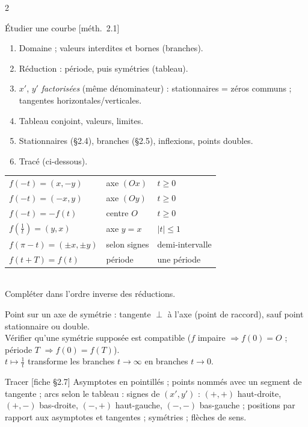 \documentclass[a4paper,10pt]{article}
\newcommand{\livre}[1]{{\sffamily\scriptsize\color{Gris}[#1]}}
\begin{document}
\begin{multicols}{2}
\begin{METH}{Étudier une courbe \livre{méth.~2.1}}
\begin{enumerate}
\item Domaine ; valeurs interdites et bornes (branches).
\item Réduction : période, puis symétries (tableau).
\item $x'$, $y'$ \emph{factorisées} (même dénominateur) : stationnaires = zéros communs ; tangentes horizontales/verticales.
\item Tableau conjoint, valeurs, limites.
\item Stationnaires (§2.4), branches (§2.5), inflexions, points doubles.
\item Tracé (ci-dessous).
\end{enumerate}
\end{METH}

\begin{FORM}[SYMÉTRIES : chercher $\varphi$ avec $M(\varphi(t))=s(M(t))$]
\renewcommand{\arraystretch}{1.1}
\begin{tabular}{@{}lll@{}}
$f(-t)=(x,-y)$ & axe $(Ox)$ & $t\geq0$\\
$f(-t)=(-x,y)$ & axe $(Oy)$ & $t\geq0$\\
$f(-t)=-f(t)$ & centre $O$ & $t\geq0$\\
$f(\frac1t)=(y,x)$ & axe $y=x$ & $|t|\leq1$\\
$f(\pi-t)=(\pm x,\pm y)$ & selon signes & demi-intervalle\\
$f(t+T)=f(t)$ & période & une période
\end{tabular}\\
Compléter dans l'ordre inverse des réductions.
\end{FORM}

\begin{ASTU}
Point sur un axe de symétrie : tangente $\perp$ à l'axe (point de raccord), sauf point stationnaire ou double.\\
Vérifier qu'une symétrie supposée est compatible ($f$ impaire $\Rightarrow f(0)=O$ ; période $T$ $\Rightarrow f(0)=f(T)$).\\
$t\mapsto\frac1t$ transforme les branches $t\to\infty$ en branches $t\to0$.
\end{ASTU}

\begin{METH}{Tracer \livre{fiche §2.7}}
Asymptotes en pointillés ; points nommés avec un segment de tangente ; arcs selon le tableau : signes de $(x',y')$ :
$(+,+)$ haut-droite, $(+,-)$ bas-droite, $(-,+)$ haut-gauche, $(-,-)$ bas-gauche ; positions par rapport aux asymptotes et
tangentes ; symétries ; flèches de sens.
\end{METH}


\end{multicols}
\end{document}
